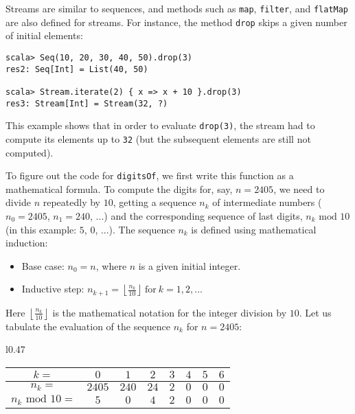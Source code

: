 Streams are similar to sequences, and methods such as \lstinline!map!,
\lstinline!filter!, and \lstinline!flatMap! are also defined for
streams. For instance, the method \lstinline!drop! skips a given
number of initial elements:
\begin{lstlisting}
scala> Seq(10, 20, 30, 40, 50).drop(3)
res2: Seq[Int] = List(40, 50)

scala> Stream.iterate(2) { x => x + 10 }.drop(3)
res3: Stream[Int] = Stream(32, ?)
\end{lstlisting}
This example shows that in order to evaluate \lstinline!drop(3)!,
the stream had to compute its elements up to \lstinline!32! (but
the subsequent elements are still not computed).

To figure out the code for \lstinline!digitsOf!, we first write this
function as a mathematical formula. To compute the digits for, say,
$n=2405$, we need to divide $n$ repeatedly by $10$, getting a sequence
$n_{k}$ of intermediate numbers ($n_{0}=2405$, $n_{1}=240$, ...)
and the corresponding sequence of last digits, $n_{k}\text{ mod }10$
(in this example: $5$, $0$, ...). The sequence $n_{k}$ is defined
using mathematical induction:
\begin{itemize}
\item Base case: $n_{0}=n$, where $n$ is a given initial integer.
\item Inductive step: $n_{k+1}=\left\lfloor \frac{n_{k}}{10}\right\rfloor \ \text{for}\ k=1,2,...$
\end{itemize}
Here $\left\lfloor \frac{n_{k}}{10}\right\rfloor $ is the mathematical
notation for the integer division by $10$. Let us tabulate the evaluation
of the sequence $n_{k}$ for $n=2405$: 

\begin{wraptable}{l}{0.47\columnwidth}%
\begin{centering}
\vspace{-0.85\baselineskip}
\begin{tabular}{|c|c|c|c|c|c|c|c|}
\hline 
{\small{}$k=$} & {\small{}$0$} & {\small{}$1$} & {\small{}$2$} & {\small{}$3$} & {\small{}$4$} & {\small{}$5$} & {\small{}$6$}\tabularnewline
\hline 
{\small{}$n_{k}=$} & {\small{}$2405$} & {\small{}$240$} & {\small{}$24$} & {\small{}$2$} & {\small{}$0$} & {\small{}$0$} & {\small{}$0$}\tabularnewline
\hline 
{\small{}$n_{k}\text{ mod }10=$} & {\small{}$5$} & {\small{}$0$} & {\small{}$4$} & {\small{}$2$} & {\small{}$0$} & {\small{}$0$} & {\small{}$0$}\tabularnewline
\hline 
\end{tabular}
\par\end{centering}
\vspace{-1\baselineskip}
\end{wraptable}%

